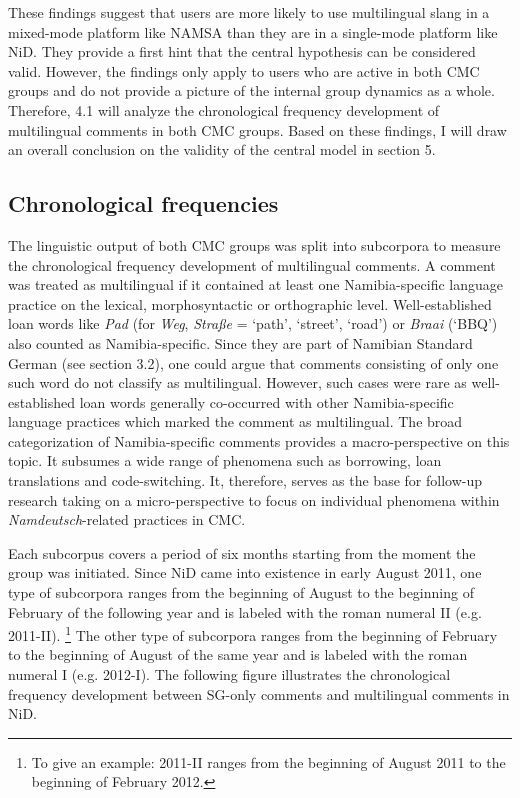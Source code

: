 \documentclass[output=paper]{langsci/langscibook}
\begin{document}
These findings suggest that users are more likely to use multilingual slang in a mixed-mode platform like NAMSA than they are in a single-mode platform like NiD. They provide a first hint that the central hypothesis can be considered valid. However, the findings only apply to users who are active in both CMC groups and do not provide a picture of the internal group dynamics as a whole. Therefore, 4.1 will analyze the chronological frequency development of multilingual comments in both CMC groups. Based on these findings, I will draw an overall conclusion on the validity of the central model in section 5. 

 
   
\subsection{Chronological frequencies}
 \label{sec:radke:4.2}

The linguistic output of both CMC groups was split into subcorpora to measure the chronological frequency development of multilingual comments. A comment was treated as multilingual if it contained at least one Namibia-specific language practice on the lexical, morphosyntactic or orthographic level. Well-established loan words like \textit{Pad} (for \textit{Weg}, \textit{Straße} = ‘path’, ‘street’, ‘road’) or \textit{Braai} (‘BBQ’) also counted as Namibia-specific. Since they are part of Namibian Standard German (see section 3.2), one could argue that comments consisting of only one such word do not classify as multilingual. However, such cases were rare as well-established loan words generally co-occurred with other Namibia-specific language practices which marked the comment as multilingual. The broad categorization of Namibia-specific comments provides a macro-perspective on this topic. It subsumes a wide range of phenomena such as borrowing, loan translations and code-switching. It, therefore, serves as the base for follow-up research taking on a micro-perspective to focus on individual phenomena within \textit{Namdeutsch}-related practices in CMC. 

Each subcorpus covers a period of six months starting from the moment the group was initiated. Since NiD came into existence in early August 2011, one type of subcorpora ranges from the beginning of August to the beginning of February of the following year and is labeled with the roman numeral II (e.g. 2011-II). \footnote{To give an example: 2011-II ranges from the beginning of August 2011 to the beginning of February 2012.} The other type of subcorpora ranges from the beginning of February to the beginning of August of the same year and is labeled with the roman numeral I (e.g. 2012-I). The following figure illustrates the chronological frequency development between SG-only comments and multilingual comments in NiD. 
\end{document}
